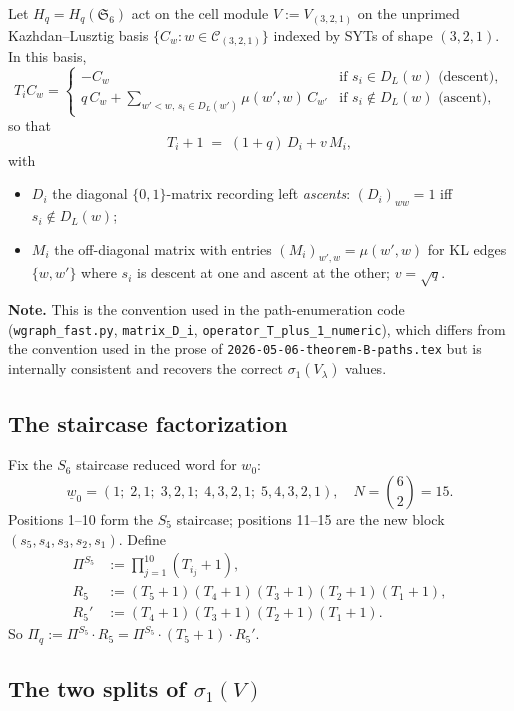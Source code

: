 \documentclass[11pt]{article}
\theoremstyle{definition}
\begin{document}
Let $H_q = H_q(\mathfrak{S}_6)$ act on the cell module $V := V_{(3,2,1)}$ on the unprimed Kazhdan--Lusztig basis $\{C_w : w \in \mathcal{C}_{(3,2,1)}\}$ indexed by SYTs of shape $(3,2,1)$. In this basis,
\[
T_i C_w = \begin{cases} -C_w & \text{if } s_i \in D_L(w) \text{ (descent)},\\ q\,C_w + \sum_{w' < w,\, s_i \in D_L(w')} \mu(w', w)\,C_{w'} & \text{if } s_i \notin D_L(w) \text{ (ascent)}, \end{cases}
\]
so that
\begin{equation}\label{eq:Tplus1}
T_i + 1 \;=\; (1+q)\,D_i + v\,M_i,
\end{equation}
with
\begin{itemize}[leftmargin=2em,topsep=0.3em,itemsep=0.2em]
\item $D_i$ the diagonal $\{0,1\}$-matrix recording left \emph{ascents}: $(D_i)_{ww} = 1$ iff $s_i \notin D_L(w)$;
\item $M_i$ the off-diagonal matrix with entries $(M_i)_{w', w} = \mu(w', w)$ for KL edges $\{w, w'\}$ where $s_i$ is descent at one and ascent at the other; $v = \sqrt q$.
\end{itemize}
\textbf{Note.} This is the convention used in the path-enumeration code (\texttt{wgraph\_fast.py}, \texttt{matrix\_D\_i}, \texttt{operator\_T\_plus\_1\_numeric}), which differs from the convention used in the prose of \texttt{2026-05-06-theorem-B-paths.tex} but is internally consistent and recovers the correct $\sigma_1(V_\lambda)$ values.

\subsection*{The staircase factorization}

Fix the $S_6$ staircase reduced word for $w_0$:
\[
\underline{w}_0 = (1;\; 2,1;\; 3,2,1;\; 4,3,2,1;\; 5,4,3,2,1), \quad N = \binom{6}{2} = 15.
\]
Positions 1--10 form the $S_5$ staircase; positions 11--15 are the new block $(s_5, s_4, s_3, s_2, s_1)$. Define
\begin{align*}
\Pi^{S_5} &:= \prod_{j=1}^{10} (T_{i_j} + 1),\\
R_5 &:= (T_5+1)(T_4+1)(T_3+1)(T_2+1)(T_1+1),\\
R_5' &:= (T_4+1)(T_3+1)(T_2+1)(T_1+1).
\end{align*}
So $\Pi_q := \Pi^{S_5} \cdot R_5 = \Pi^{S_5} \cdot (T_5+1) \cdot R_5'$.

\subsection*{The two splits of $\sigma_1(V)$}
\end{document}
